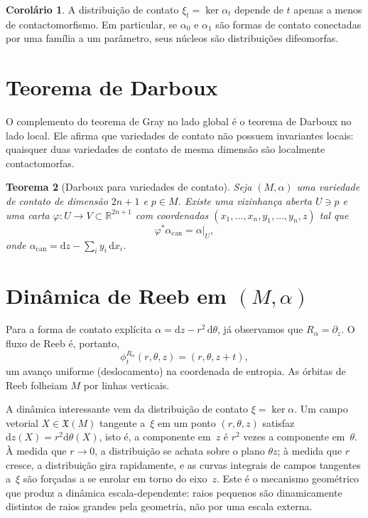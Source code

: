 \documentclass[12pt,a4paper,twoside]{book}
\theoremstyle{plain}
\newtheorem{teorema}{Teorema}[section]
\theoremstyle{definition}
\newtheorem{corolario}[teorema]{Corolário}
\theoremstyle{definition}
\newcommand{\R}{\mathbb{R}}
\newcommand{\Reeb}{R_\alpha}
\newcommand{\dd}{\mathrm{d}}
\begin{document}
\begin{corolario}\label{cor:gray-distrib-fixa}
A distribuição de contato $\xi_{t} = \ker\alpha_{t}$ depende de $t$ apenas
a menos de contactomorfismo. Em particular, se $\alpha_{0}$ e $\alpha_{1}$
são formas de contato conectadas por uma família a um parâmetro, seus núcleos
são distribuições difeomorfas.
\end{corolario}

\section{Teorema de Darboux}
\label{sec:darboux}

O complemento do teorema de Gray no lado global é o teorema de Darboux no
lado local. Ele afirma que variedades de contato não possuem invariantes
locais: quaisquer duas variedades de contato de mesma dimensão são
localmente contactomorfas.

\begin{teorema}[Darboux para variedades de contato]\label{thm:darboux}
Seja $(M,\alpha)$ uma variedade de contato de dimensão $2n+1$ e $p \in M$.
Existe uma vizinhança aberta $U \ni p$ e uma carta $\varphi : U \to V \subset \R^{2n+1}$
com coordenadas $(x_{1},\dots,x_{n},y_{1},\dots,y_{n},z)$ tal que
\[
  \varphi^{\ast}\alpha_{\mathrm{can}} = \alpha|_{U},
\]
onde $\alpha_{\mathrm{can}} = \dd z - \sum_i y_{i}\,\dd x_{i}$.
\end{teorema}

\section{Dinâmica de Reeb em $(M,\alpha)$}
\label{sec:reeb-din}

Para a forma de contato explícita $\alpha = \dd z - r^{2}\,\dd\theta$,
já observamos que $\Reeb = \partial_{z}$. O fluxo de Reeb é, portanto,
\[
  \phi_{t}^{\Reeb}(r,\theta,z) = (r, \theta, z+t),
\]
um avanço uniforme (deslocamento) na coordenada de entropia. As órbitas de Reeb
folheiam $M$ por linhas verticais.

A dinâmica interessante vem da distribuição de contato $\xi = \ker\alpha$.
Um campo vetorial $X \in \mathfrak{X}(M)$ tangente a~$\xi$ em um ponto
$(r,\theta,z)$ satisfaz $\dd z(X) = r^{2}\dd\theta(X)$, isto é, a
componente em~$z$ é $r^{2}$ vezes a componente em~$\theta$. À medida que
$r \to 0$, a distribuição se achata sobre o plano $\theta z$; à medida que
$r$ cresce, a distribuição gira rapidamente, e as curvas integrais de
campos tangentes a~$\xi$ são forçadas a se enrolar em torno do eixo~$z$.
Este é o mecanismo geométrico que produz a dinâmica escala-dependente:
raios pequenos são dinamicamente distintos de raios grandes pela
geometria, não por uma escala externa.
\end{document}
